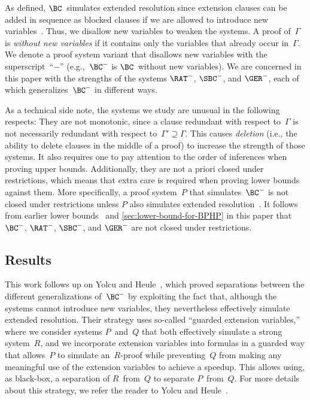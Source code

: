 \documentclass[10pt,a4paper]{article}
\begin{document}
As defined, $\BC$~simulates extended resolution
since extension clauses can be added in sequence as blocked clauses
if we are allowed to introduce new variables~\cite[see][Section~6]{Kul99b}.
Thus, we disallow new variables to weaken the systems.
A proof of~$\Gamma$ is \emph{without new variables}
if it contains only the variables that already occur in~$\Gamma$.
We denote a proof system variant that disallows new variables
with the superscript~``$-$'' (e.g.,~$\BC^-$ is $\BC$~without new variables).
We are concerned in this paper with the strengths of
the systems $\RAT^-$, $\SBC^-$, and $\GER^-$,
each of which generalizes~$\BC^-$ in different ways.

As a technical side note, the systems we study
are unusual in the following respects:
They are not monotonic, since a clause redundant with respect to~$\Gamma$
is not necessarily redundant with respect to~$\Gamma' \supseteq \Gamma$.
This causes \emph{deletion} (i.e., the ability
to delete clauses in the middle of a proof)
to increase the strength of those systems.
It also requires one to pay attention to
the order of inferences when proving upper bounds.
Additionally, they are not a priori closed under restrictions,
which means that extra care is required when proving lower bounds against them.
More specifically, a proof system~$P$ that simulates~$\BC^-$
is not closed under restrictions unless $P$
also simulates extended resolution~\cite[Theorem~2.4]{BT21}.
It follows from earlier lower bounds~\cite{Kul99b,BT21}
and \cref{sec:lower-bound-for-BPHP} in this paper
that $\BC^-$, $\RAT^-$, $\SBC^-$, and $\GER^-$ are not closed under restrictions.

\subsection{Results}
\label{sec:results}

This work follows up on Yolcu and Heule~\cite{YH23},
which proved separations between the different generalizations of~$\BC^-$
by exploiting the fact that, although the systems cannot introduce new variables,
they nevertheless effectively simulate~\cite{PS10} extended resolution.
Their strategy uses so-called ``guarded extension variables,''
where we consider systems $P$~and~$Q$
that both effectively simulate a strong system~$R$,
and we incorporate extension variables into formulas
in a guarded way that allows~$P$ to simulate an~$R$-proof
while preventing~$Q$ from making any meaningful use
of the extension variables to achieve a speedup.
This allows using, as black-box,
a separation of $R$~from~$Q$ to separate $P$~from~$Q$.
For more details about this strategy,
we refer the reader to Yolcu and Heule~\cite[Section~1.3]{YH23}.
\end{document}
